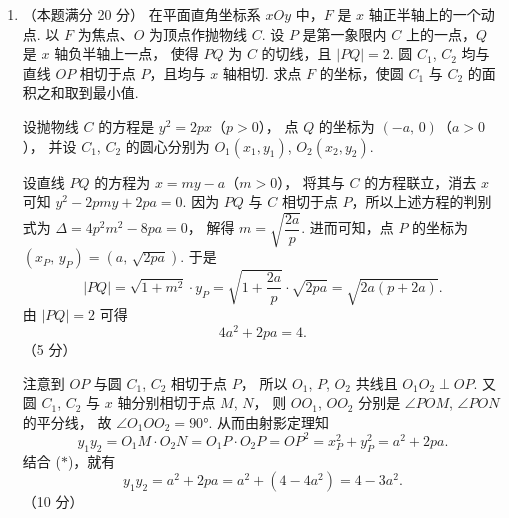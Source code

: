 \documentclass{chsmc}
\begin{document}
\begin{enumerate}[resume]
\begin{solution}
      从而
      \[
        a_n = a_1 \cdot \prod_{k=1}^{n-1} \frac{a_{k+1}}{a_k}
            = \prod_{k=1}^{n-1} \frac{1}{k}
            = \frac{1}{(n-1)!}.
      \]
      \hfill（10 分）

      因此
      \begin{align*}
        \sum_{i=1}^{50} a_i\, a_{101-i}
        &= \sum_{i=1}^{50} \frac{1}{(i-1)!\,(100-i)!}
         = \sum_{i=0}^{49} \frac{1}{i!\,(99-i)!} \\
        &= \frac{1}{99!} \sum_{i=0}^{49} C_{99}^i
         = \frac{1}{99!} \sum_{i=0}^{49} \frac{1}{2}\bigl(C_{99}^i + C_{99}^{99-i}\bigr)
         = \frac{1}{99!} \times \frac{1}{2} \times 2^{99}
         = \frac{2^{98}}{99!}.
      \end{align*}
      \hfill（20 分）
    \end{solution}

  \item （本题满分 20 分）
    在平面直角坐标系 $xOy$ 中，$F$ 是 $x$ 轴正半轴上的一个动点.
    以 $F$ 为焦点、$O$ 为顶点作抛物线 $C$.
    设 $P$ 是第一象限内 $C$ 上的一点，$Q$ 是 $x$ 轴负半轴上一点，
    使得 $PQ$ 为 $C$ 的切线，且 $|PQ| = 2$.
    圆 $C_1$, $C_2$ 均与直线 $OP$ 相切于点 $P$，且均与 $x$ 轴相切.
    求点 $F$ 的坐标，使圆 $C_1$ 与 $C_2$ 的面积之和取到最小值.
    \begin{solution}
      设抛物线 $C$ 的方程是 $y^2 = 2px$（$p > 0$），
      点 $Q$ 的坐标为 $(-a,\,0)$（$a > 0$），
      并设 $C_1$, $C_2$ 的圆心分别为 $O_1(x_1,y_1)$, $O_2(x_2,y_2)$.

      设直线 $PQ$ 的方程为 $x = my - a$（$m > 0$），
      将其与 $C$ 的方程联立，消去 $x$ 可知
      $y^2 - 2pmy + 2pa = 0$.
      因为 $PQ$ 与 $C$ 相切于点 $P$，所以上述方程的判别式为
      $\Delta = 4p^2 m^2 - 8pa = 0$，
      解得 $m = \sqrt{\dfrac{2a}{p}}$.
      进而可知，点 $P$ 的坐标为 $(x_P,\,y_P) = (a,\,\sqrt{2pa})$.
      于是
      \[
        |PQ| = \sqrt{1 + m^2} \cdot y_P
             = \sqrt{1 + \frac{2a}{p}} \cdot \sqrt{2pa}
             = \sqrt{2a(p + 2a)}.
      \]
      由 $|PQ| = 2$ 可得
      \[
        4a^2 + 2pa = 4. \tag{$*$}
      \]\hfill（5 分）

      注意到 $OP$ 与圆 $C_1$, $C_2$ 相切于点 $P$，
      所以 $O_1$, $P$, $O_2$ 共线且 $O_1 O_2 \perp OP$.
      又圆 $C_1$, $C_2$ 与 $x$ 轴分别相切于点 $M$, $N$，
      则 $OO_1$, $OO_2$ 分别是 $\angle POM$, $\angle PON$ 的平分线，
      故 $\angle O_1 OO_2 = 90°$.
      从而由射影定理知
      \[
        y_1 y_2 = O_1 M \cdot O_2 N = O_1 P \cdot O_2 P
                = OP^2 = x_P^2 + y_P^2 = a^2 + 2pa.
      \]
      结合 ($*$)，就有
      \[
        y_1 y_2 = a^2 + 2pa = a^2 + (4 - 4a^2) = 4 - 3a^2. \tag{$**$}
      \]\hfill（10 分）


\end{solution}
\end{enumerate}
\end{document}
